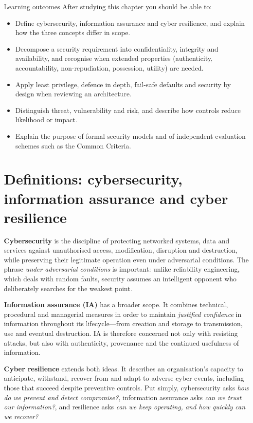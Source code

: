 \documentclass[11pt,openany]{book}
\begin{document}
\begin{outcomesbox}{Learning outcomes}
After studying this chapter you should be able to:
\begin{itemize}
  \item Define cybersecurity, information assurance and cyber resilience, and explain how the three concepts differ in scope.
  \item Decompose a security requirement into confidentiality, integrity and availability, and recognise when extended properties (authenticity, accountability, non-repudiation, possession, utility) are needed.
  \item Apply least privilege, defence in depth, fail-safe defaults and security by design when reviewing an architecture.
  \item Distinguish threat, vulnerability and risk, and describe how controls reduce likelihood or impact.
  \item Explain the purpose of formal security models and of independent evaluation schemes such as the Common Criteria.
\end{itemize}
\end{outcomesbox}

\section{Definitions: cybersecurity, information assurance and cyber resilience}\label{sec:1.1}
\textbf{Cybersecurity} is the discipline of protecting networked systems, data and services against unauthorised access, modification, disruption and destruction, while preserving their legitimate operation even under adversarial conditions. The phrase \emph{under adversarial conditions} is important: unlike reliability engineering, which deals with random faults, security assumes an intelligent opponent who deliberately searches for the weakest point.

\textbf{Information assurance (IA)} has a broader scope. It combines technical, procedural and managerial measures in order to maintain \emph{justified confidence} in information throughout its lifecycle—from creation and storage to transmission, use and eventual destruction. IA is therefore concerned not only with resisting attacks, but also with authenticity, provenance and the continued usefulness of information.

\textbf{Cyber resilience} extends both ideas. It describes an organisation's capacity to anticipate, withstand, recover from and adapt to adverse cyber events, including those that succeed despite preventive controls. Put simply, cybersecurity asks \emph{how do we prevent and detect compromise?}, information assurance asks \emph{can we trust our information?}, and resilience asks \emph{can we keep operating, and how quickly can we recover?}
\end{document}
